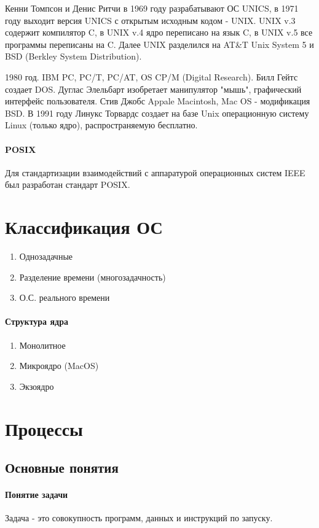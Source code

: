 \documentclass[]{article}
\begin{document}
	Кенни Томпсон и Денис Ритчи в 1969 году разрабатывают ОС UNICS, в 1971 году выходит версия UNICS с открытым исходным кодом - UNIX. UNIX v.3 содержит компилятор C, в UNIX v.4 ядро переписано на язык C, в UNIX v.5 все программы переписаны на C. Далее UNIX разделился на AT\&T Unix System 5 и BSD (Berkley System Distribution).
	
	1980 год. IBM PC, PC/T, PC/AT, OS CP/M (Digital Research). Билл Гейтс создает DOS. Дуглас Элельбарт изобретает манипулятор "мышь", графический интерфейс пользователя. Стив Джобс Appale Macintosh, Mac OS - модификация BSD.
	В 1991 году Линукс Торвардс создает на базе Unix операционную систему Linux (только ядро), распространяемую бесплатно.
	\paragraph{POSIX}
		Для стандартизации взаимодействий с аппаратурой операционных систем IEEE был разработан стандарт POSIX.
	
	\section{Классификация ОС}
		\begin{enumerate}
			\item Однозадачные
			\item Разделение времени (многозадачность)
			\item О.С. реального времени
		\end{enumerate}
		
		\paragraph{Структура ядра}
		\begin{enumerate}
			\item Монолитное
			\item Микроядро (MacOS)
			\item Экзоядро
		\end{enumerate}
	\section{Процессы}
	\subsection{Основные понятия}
		\paragraph{Понятие задачи}
		Задача -  это совокупность программ, данных и инструкций по запуску.
\end{document}
